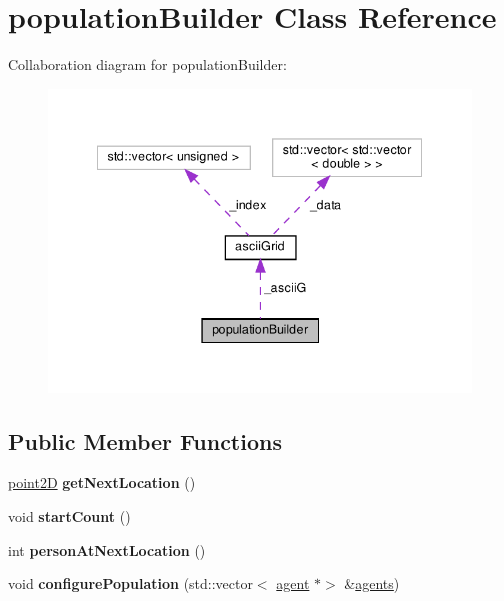 \hypertarget{classpopulationBuilder}{}\section{population\+Builder Class Reference}
\label{classpopulationBuilder}


Collaboration diagram for population\+Builder\+:\nopagebreak
\begin{figure}[H]
\begin{center}
\leavevmode
\includegraphics[width=342pt]{classpopulationBuilder__coll__graph}
\end{center}
\end{figure}
\subsection*{Public Member Functions}
\begin{DoxyCompactItemize}
\item 
\mbox{\label{classpopulationBuilder_a464b444e7d17fcdcce70753eb71791d1}} 
\mbox{\hyperlink{classpoint2D}{point2D}} {\bfseries get\+Next\+Location} ()
\item 
\mbox{\label{classpopulationBuilder_aefaffd4d8bdadd7f1ff58e604095a9b0}} 
void {\bfseries start\+Count} ()
\item 
\mbox{\label{classpopulationBuilder_a5a288f060298983de16fc85972614a3a}} 
int {\bfseries person\+At\+Next\+Location} ()
\item 
\mbox{\label{classpopulationBuilder_a64f8562892260879b013d8b07cd2727e}} 
void {\bfseries configure\+Population} (std\+::vector$<$ \mbox{\hyperlink{classagent}{agent}} $\ast$$>$ \&\mbox{\hyperlink{classagents}{agents}})
\end{DoxyCompactItemize}
